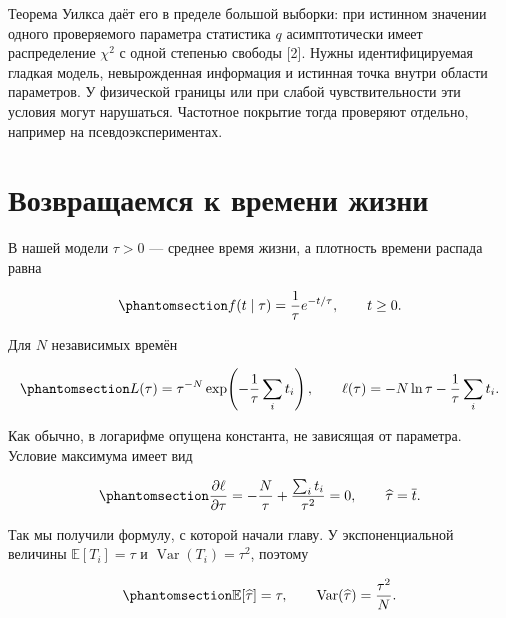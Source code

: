 \documentclass[
  russian,
  11pt,
  a4paper,
  open=any]{scrbook}
\begin{document}
Теорема Уилкса даёт его в пределе большой выборки: при истинном значении
одного проверяемого параметра статистика \(q\) асимптотически имеет
распределение \(\chi^2\) с одной степенью свободы {[}2{]}. Нужны
идентифицируемая гладкая модель, невырожденная информация и истинная
точка внутри области параметров. У физической границы или при слабой
чувствительности эти условия могут нарушаться. Частотное покрытие тогда
проверяют отдельно, например на псевдоэкспериментах.

\section{Возвращаемся к времени
жизни}\label{ux432ux43eux437ux432ux440ux430ux449ux430ux435ux43cux441ux44f-ux43a-ux432ux440ux435ux43cux435ux43dux438-ux436ux438ux437ux43dux438}

В нашей модели \(\tau>0\) --- среднее время жизни, а плотность времени
распада равна

\begin{equation}\protect\phantomsection\label{eq-ch10-lifetime-density}{
f(t\mid\tau)=\frac1\tau e^{-t/\tau},\qquad t\geq0.
}\end{equation}

Для \(N\) независимых времён

\begin{equation}\protect\phantomsection\label{eq-ch10-lifetime-likelihood}{
L(\tau)=\tau^{-N}\exp\!\left(-\frac1\tau\sum_i t_i\right),
\qquad
\ell(\tau)=-N\ln\tau-\frac1\tau\sum_i t_i.
}\end{equation}

Как обычно, в логарифме опущена константа, не зависящая от параметра.
Условие максимума имеет вид

\begin{equation}\protect\phantomsection\label{eq-ch10-lifetime-mle}{
\frac{\partial\ell}{\partial\tau}
=-\frac N\tau+\frac{\sum_i t_i}{\tau^2}=0,
\qquad
\widehat\tau=\overline t.
}\end{equation}

Так мы получили формулу, с которой начали главу. У экспоненциальной
величины \(\mathbb E[T_i]=\tau\) и \(\operatorname{Var}(T_i)=\tau^2\),
поэтому

\begin{equation}\protect\phantomsection\label{eq-ch10-lifetime-estimator-moments}{
\mathbb E[\widehat\tau]=\tau,
\qquad
\operatorname{Var}(\widehat\tau)=\frac{\tau^2}{N}.
}\end{equation}
\end{document}
